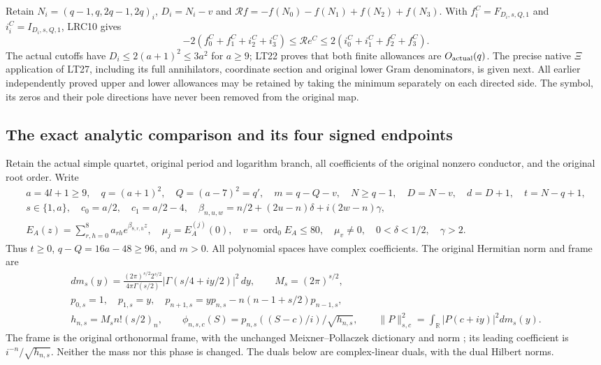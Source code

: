 Retain $N_i=(q-1,q,2q-1,2q)_i$, $D_i=N_i-v$ and
$\mathcal R f=-f(N_0)-f(N_1)+f(N_2)+f(N_3)$.
With $f_i^C=F_{D_i,s,Q,1}$ and $i_i^C=I_{D_i,s,Q,1}$, LRC10 gives
\[
 -2(f_0^C+f_1^C+i_2^C+i_3^C)
 \le\mathcal Re^C\le
 2(i_0^C+i_1^C+f_2^C+f_3^C).                            \tag{LT28}
\]
The actual cutoffs have $D_i\le2(a+1)^2\le3a^2$ for $a\ge9$;
LT22 proves that both finite allowances are $O_{\rm actual}(q)$.
The precise native $\Xi$ application of LT27, including its full
annihilators, coordinate section and original lower Gram denominators,
is given next. All earlier independently proved upper and lower
allowances may be retained by taking the minimum separately on each
directed side. The symbol, its zeros and their pole directions have
never been removed from the original map.
\endgroup


\begingroup
\subsection{The exact analytic comparison and its four signed endpoints}
\label{sec:xi-exact-map}

Retain the actual simple quartet, original period and logarithm branch,
all coefficients of the original nonzero conductor, and the original root
order. Write
\[
\begin{gathered}
 a=4l+1\ge9,\quad q=(a+1)^2,\quad Q=(a-7)^2=q',\quad
 m=q-Q-v,\quad N\ge q-1,\quad D=N-v,\quad
 d=D+1,\quad t=N-q+1,\\
 s\in\{1,a\},\quad c_0=a/2,\quad c_1=a/2-4,\quad
 \beta_{n,u,w}=n/2+(2u-n)\delta+i(2w-n)\gamma,\\
 E_A(z)=\sum_{r,h=0}^{8}a_{rh}e^{\beta_{8,r,h}z},\quad
 \mu_j=E_A^{(j)}(0),\quad v=\operatorname{ord}_0E_A\le80,\quad
 \mu_v\ne0,\quad 0<\delta<1/2,\quad\gamma>2.
\end{gathered}\tag{XIM1}
\]
Thus $t\ge0$, $q-Q=16a-48\ge96$, and $m>0$. All polynomial
spaces have complex coefficients. The original Hermitian norm and frame are
\[
\begin{gathered}
 dm_s(y)=\frac{(2\pi)^{s/2}2^{s/2}}{4\pi\Gamma(s/2)}
           |\Gamma(s/4+iy/2)|^2\,dy,\qquad M_s=(2\pi)^{s/2},\\
 p_{0,s}=1,\quad p_{1,s}=y,\quad
 p_{n+1,s}=yp_{n,s}-n(n-1+s/2)p_{n-1,s},\\
 h_{n,s}=M_sn!(s/2)_n,\qquad
 \phi_{n,s,c}(S)=p_{n,s}((S-c)/i)/\sqrt{h_{n,s}},\qquad
 \|P\|_{s,c}^2=\int_{\mathbb R}|P(c+iy)|^2dm_s(y).
\end{gathered}\tag{XIM2}
\]
The frame is the original orthonormal frame, with the unchanged
Meixner--Pollaczek dictionary and norm
\cite[eqs.~(18.19.8)--(18.19.9), (18.22.8)]{human:dlmf18}; its leading coefficient is
$i^{-n}/\sqrt{h_{n,s}}$. Neither the mass nor this phase is changed.
The duals below are complex-linear duals, with the dual Hilbert norms.

